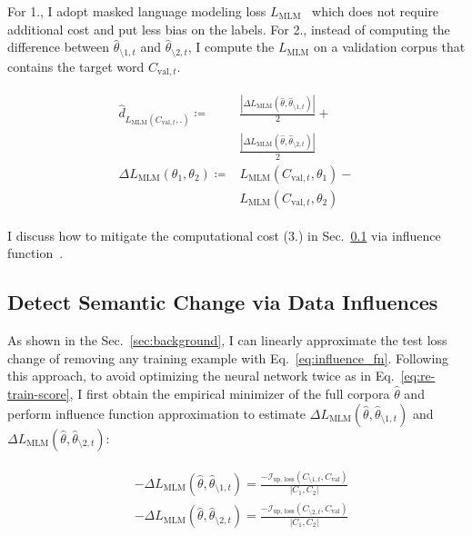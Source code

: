 For 1., I adopt masked language modeling loss $L_\text{MLM}$~\cite{BERT} which does not require additional cost and 
put less bias on the labels.
For 2., instead of computing the difference between $\hat{\theta}_{\setminus 1, t}$ and $\hat{\theta}_{\setminus 2, t}$, I compute the $L_\text{MLM}$ on a validation corpus that contains the target word $C_{\text{val}, t}$.


\begin{align}
\begin{split}
    \hat{d}_{L_\text{MLM}(C_{\text{val}, t}, .)} \coloneqq &\frac{|\Delta L_\text{MLM}(\hat{\theta}, \hat{\theta}_{\setminus 1, t})|}{2} + \\
        &\frac{|\Delta L_\text{MLM}(\hat{\theta}, \hat{\theta}_{\setminus 2, t})|}{2}\\
    \Delta L_\text{MLM}(\theta_1, \theta_2) \coloneqq &L_\text{MLM}(C_{\text{val}, t}, \theta_1) - \\&L_\text{MLM}(C_{\text{val}, t}, \theta_2)
    \label{eq:scores_mlm}
\end{split}
\end{align}

\noindent I discuss how to mitigate the computational cost (3.) in Sec.~\ref{sec:influence_fn} via influence function~\cite{influence_fn}.


\subsection{Detect Semantic Change via Data Influences}\label{sec:influence_fn}
As shown in the Sec.~\ref{sec:background}, I can linearly approximate the test loss change of removing any training example with Eq.~\ref{eq:influence_fn}.
Following this approach, to avoid optimizing the neural network twice as in Eq.~\ref{eq:re-train-score}, 
I first obtain the empirical minimizer of the full corpora $\hat{\theta}$ and perform influence function approximation to estimate $\Delta L_\text{MLM}(\hat{\theta}, \hat{\theta}_{\setminus 1, t})$ and 
$\Delta L_\text{MLM}(\hat{\theta}, \hat{\theta}_{\setminus 2, t})$:



\begin{align}
\begin{split}
    &-\Delta L_\text{MLM}(\hat{\theta}, \hat{\theta}_{\setminus 1, t}) = \frac{-\mathcal{I}_\text{up, loss}(C_{\setminus 1, t}, C_\text{val})}{|C_1, C_2|} \\ 
    &-\Delta L_\text{MLM}(\hat{\theta}, \hat{\theta}_{\setminus 2, t}) = \frac{-\mathcal{I}_\text{up, loss}(C_{\setminus 2, t}, C_\text{val})}{|C_1, C_2|}    
    \label{eq:influence_fn_mlm}
\end{split}
\end{align}


